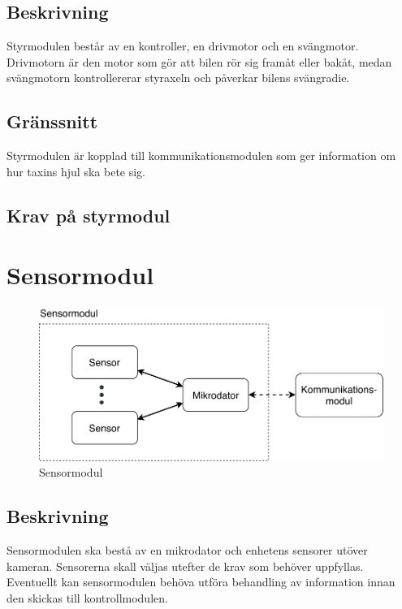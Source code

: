 \documentclass[kravspec/krav.tex]{subfiles}
\begin{document}
\subsection{Beskrivning}
Styrmodulen består av en kontroller, en drivmotor och en svängmotor. Drivmotorn
är den motor som gör att bilen rör sig framåt eller bakåt, medan svängmotorn
kontrollererar styraxeln och påverkar bilens svängradie.

\subsection{Gränssnitt}
Styrmodulen är kopplad till kommunikationsmodulen som ger information om hur
taxins hjul ska bete sig.

\subsection{Krav på styrmodul}
\begin{reqlist}
\end{reqlist}

\clearpage
\section{Sensormodul}
\begin{figure}[h]
    \centering
    \includegraphics[width=0.6\linewidth]{kravspec/figures/sensormodul.pdf}
    \caption{Sensormodul}
    \label{fig:sensormodul}
\end{figure}

\subsection{Beskrivning}
Sensormodulen ska bestå av en mikrodator och enhetens sensorer utöver kameran.
Sensorerna skall väljas utefter de krav som behöver uppfyllas. Eventuellt kan
sensormodulen behöva utföra behandling av information innan den skickas till
kontrollmodulen.
\end{document}
